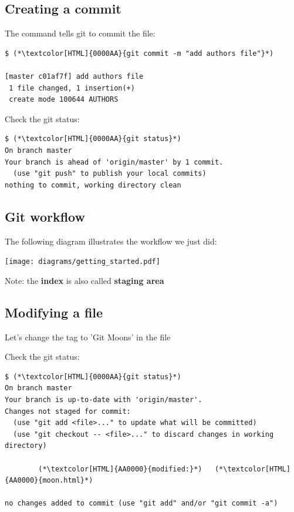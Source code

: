 \subsection{Creating a commit}
\begin{frame}[fragile]
  \subslidetitle

  The command  tells git to commit the file:
  \begin{lstlisting}
$ (*\textcolor[HTML]{0000AA}{git commit -m "add authors file"}*)

[master c01af7f] add authors file
 1 file changed, 1 insertion(+)
 create mode 100644 AUTHORS
\end{lstlisting}

  Check the git status:
  \begin{lstlisting}
$ (*\textcolor[HTML]{0000AA}{git status}*)
On branch master
Your branch is ahead of 'origin/master' by 1 commit.
  (use "git push" to publish your local commits)
nothing to commit, working directory clean
\end{lstlisting}
\end{frame}

\subsection{Git workflow}
\begin{frame}[fragile]
  \subslidetitle
  The following diagram illustrates the workflow we just did: \\
  \vspace{2em}
  \centerline{\texttt{[image: diagrams/getting\_started.pdf]}}

  \vspace{1em}
  Note: the \textbf{index} is also called \textbf{staging area}
\end{frame}


\subsection{Modifying a file}
\begin{frame}[fragile]
  \subslidetitle

  Let's change the  tag to 'Git Moons' in the  file

  Check the git status:
  \begin{lstlisting}
$ (*\textcolor[HTML]{0000AA}{git status}*)
On branch master
Your branch is up-to-date with 'origin/master'.
Changes not staged for commit:
  (use "git add <file>..." to update what will be committed)
  (use "git checkout -- <file>..." to discard changes in working directory)

        (*\textcolor[HTML]{AA0000}{modified:}*)   (*\textcolor[HTML]{AA0000}{moon.html}*)

no changes added to commit (use "git add" and/or "git commit -a")
\end{lstlisting}
\end{frame}

